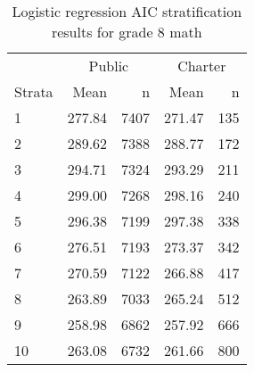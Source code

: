 \begin{table}[ht]
\centering
\caption{Logistic regression AIC stratification results for grade 8 math} 
\label{g8math-circpsa10AIC}
\begin{tabular}{lrr@{\extracolsep{.2cm}}rr}
  \hline
   & \multicolumn{2}{c}{Public} & \multicolumn{2}{c}{Charter} \\ \cline{2-3} \cline{4-5} Strata & Mean & n & Mean & n \\ \hline
1 & 277.84 & 7407 & 271.47 & 135 \\ 
  2 & 289.62 & 7388 & 288.77 & 172 \\ 
  3 & 294.71 & 7324 & 293.29 & 211 \\ 
  4 & 299.00 & 7268 & 298.16 & 240 \\ 
  5 & 296.38 & 7199 & 297.38 & 338 \\ 
  6 & 276.51 & 7193 & 273.37 & 342 \\ 
  7 & 270.59 & 7122 & 266.88 & 417 \\ 
  8 & 263.89 & 7033 & 265.24 & 512 \\ 
  9 & 258.98 & 6862 & 257.92 & 666 \\ 
  10 & 263.08 & 6732 & 261.66 & 800 \\ 
   \hline
\end{tabular}
\end{table}

